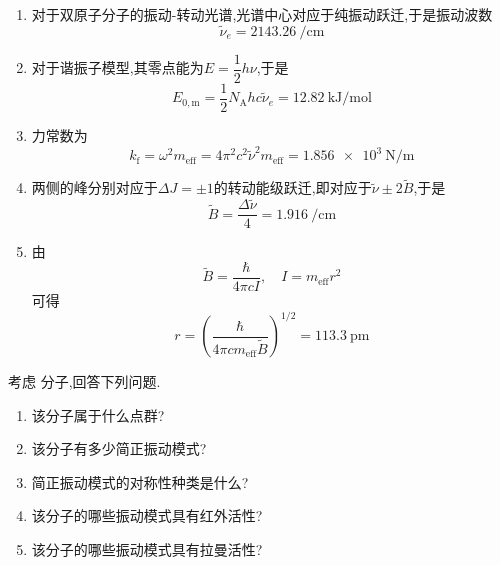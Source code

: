 \documentclass{ctexart}
\begin{document}
\begin{solution}
\begin{enumerate}[label=\tbf{(\alph*)}]
    \item 对于双原子分子的振动-转动光谱,光谱中心对应于纯振动跃迁,于是振动波数
    \[\tilde{\nu}_e=\SI{2143.26}{\per\centi\meter}\]
    \item 对于谐振子模型,其零点能为$E=\dfrac12h\nu$,于是
    \[E_{0,{\text{m}}}=\dfrac12N_{\text{A}}hc\tilde{\nu}_e=\SI{12.82}{\kilo\joule\per\mol}\]
    \item 力常数为
    \[k_{\text{f}}=\omega^2m_{\text{eff}}=4\pi^2c^2\tilde{\nu}^2m_{\text{eff}}=\SI{1.856e3}{\newton\per\meter}\]
    \item 两侧的峰分别对应于$\Delta J=\pm1$的转动能级跃迁,即对应于$\tilde{\nu}\pm2\tilde{B}$,于是
    \[\tilde{B}=\dfrac{\Delta\tilde{\nu}}{4}=\SI{1.916}{\per\centi\meter}\]
    \item 由
    \[\tilde{B}=\dfrac{\hbar}{4\pi cI},\quad I=m_{\text{eff}}r^2\]可得
    \[r=\left(\dfrac{\hbar}{4\pi c m_{\text{eff}}\tilde{B}}\right)^{1/2}=\SI{113.3}{\pico\meter}\]
\end{enumerate}
\end{solution}
\begin{homework}[9.]
    考虑 分子,回答下列问题.
    \begin{enumerate}[label=\tbf{(\alph*)}]
        \item 该分子属于什么点群?
        \item 该分子有多少简正振动模式?
        \item 简正振动模式的对称性种类是什么?
        \item 该分子的哪些振动模式具有红外活性?
        \item 该分子的哪些振动模式具有拉曼活性?
    \end{enumerate}
\end{homework}
\end{document}
